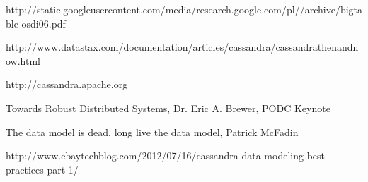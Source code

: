 \begin{thebibliography}{9}

http://static.googleusercontent.com/media/research.google.com/pl//archive/bigtable-osdi06.pdf

http://www.datastax.com/documentation/articles/cassandra/cassandrathenandnow.html

http://cassandra.apache.org

Towards Robust Distributed Systems, Dr. Eric A. Brewer, PODC Keynote

The data model is dead, long live the data model, Patrick McFadin

http://www.ebaytechblog.com/2012/07/16/cassandra-data-modeling-best-practices-part-1/

\end{thebibliography}